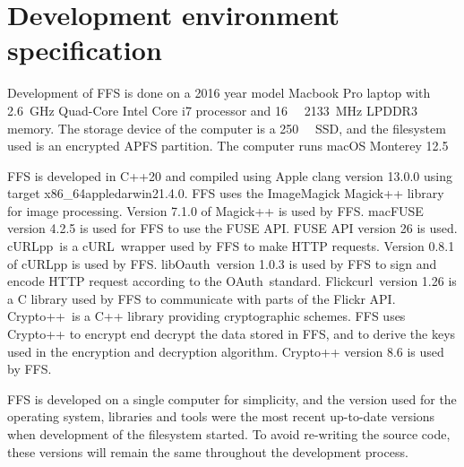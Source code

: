 \section{Development environment specification}
\label{sec:dev_env}
Development of FFS is done on a 2016 year model Macbook Pro laptop with \SI{2.6}{\giga\hertz} Quad-Core Intel Core i7 processor and \SI{16}{\giga\byte} \SI{2133}{\mega\hertz} LPDDR3 memory. The storage device of the computer is a \SI{250}{\giga\byte} SSD, and the filesystem used is an encrypted APFS partition. The computer runs macOS Monterey 12.5

FFS is developed in C++20 and compiled using Apple clang version 13.0.0 using target x86\_64\-apple\-darwin21.4.0. FFS uses the ImageMagick Magick++ library\,\cite{ImageMagick2022} for image processing. Version 7.1.0 of Magick++ is used by FFS. macFUSE\,\cite{HomeMacFUSE} version 4.2.5 is used for FFS to use the FUSE API. FUSE API version 26 is used. cURLpp\,\cite{barrette-lapierreCURLpp2022} is a cURL\,\cite{CurlCurl2022} wrapper used by FFS to make HTTP requests. Version 0.8.1 of cURLpp is used by FFS. libOauth\,\cite{Liboauth} version 1.0.3 is used by FFS to sign and encode HTTP request according to the OAuth\,\cite{barrette-lapierreCURLpp2022} standard. Flickcurl\,\cite{beckettFlickcurlLibraryFlickr} version 1.26 is a C library used by FFS to communicate with parts of the Flickr API. Crypto++\,\cite{CryptoLibraryFree} is a C++ library providing cryptographic schemes. FFS uses Crypto++ to encrypt end decrypt the data stored in FFS, and to derive the keys used in the encryption and decryption algorithm. Crypto++ version 8.6 is used by FFS.

FFS is developed on a single computer for simplicity, and the version used for the operating system, libraries and tools were the most recent up-to-date versions when development of the filesystem started. To avoid re-writing the source code, these versions will remain the same throughout the development process.